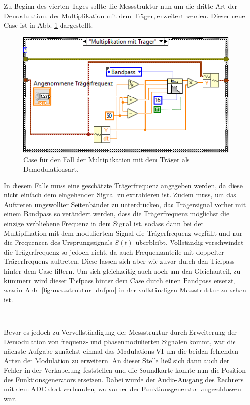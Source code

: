 
	
	\pagestyle{headings}
	Zu Beginn des vierten Tages sollte die Messstruktur nun um die dritte Art der Demodulation, der Multiplikation mit dem Träger, erweitert werden.
	Dieser neue Case ist in Abb. \ref{fig:messstruktur_dam_case3} dargestellt.
	\begin{figure}[H]
		\centering
		\includegraphics[width=\textwidth]{pic/messstruktur_dam_case3.png}
		\caption{Case für den Fall der  Multiplikation mit dem Träger als Demodulationsart.}
		\label{fig:messstruktur_dam_case3}	
	\end{figure} 
	In diesem Falle muss eine geschätzte Trägerfrequenz angegeben werden, da diese nicht einfach dem eingehenden Signal zu extrahieren ist.
	Zudem muss, um das Auftreten ungewollter Seitenbänder zu unterdrücken, das Trägersignal vorher mit einem Bandpass so verändert werden, dass die Trägerfrequenz möglichst die einzige verbliebene Frequenz in dem Signal ist, sodass dann bei der Multiplikation mit dem moduliertem Signal die Trägerfrequenz wegfällt und nur die Frequenzen des Ursprungssignals $S(t)$ überbleibt.
	Vollständig verschwindet die Trägerfrequenz so jedoch nicht, da auch Frequenzanteile mit doppelter Trägerfrequenz auftreten.
	Diese lassen sich aber wie zuvor durch den Tiefpass hinter dem Case filtern.
	Um sich gleichzeitig auch noch um den Gleichanteil, zu kümmern wird dieser Tiefpass hinter dem Case durch einen Bandpass ersetzt, was in Abb. \ref{fig:messstruktur_dafpm} in der vollständigen Messstruktur zu sehen ist.
		
	\
	
	Bevor es jedoch zu Vervollständigung der Messstruktur durch Erweiterung der Demodulation von frequenz- und phasenmodulierten Signalen kommt, war die nächste Aufgabe zunächst einmal das Modulations-VI um die beiden fehlenden Arten der Modulation zu erweitern.
	An dieser Stelle ließ sich dann auch der Fehler in der Verkabelung feststellen und die Soundkarte konnte nun die Position des Funktionsgenerators ersetzen.
	Dabei wurde der Audio-Ausgang des Rechners mit dem ADC dort verbunden, wo vorher der Funktionsgenerator angeschlossen war.
		
